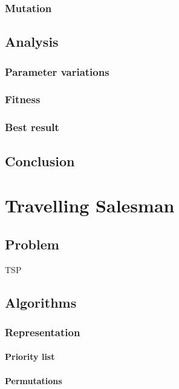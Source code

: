 \documentclass{scrartcl}
\begin{document}
\subsubsection{Mutation}


\subsection{Analysis}

\subsubsection{Parameter variations}

\subsubsection{Fitness}

\subsubsection{Best result}

\subsection{Conclusion}



\section{Travelling Salesman}

\subsection{Problem}
TSP

\subsection{Algorithms}

\subsubsection{Representation}
\paragraph{Priority list}
\paragraph{Permutations}
\end{document}
